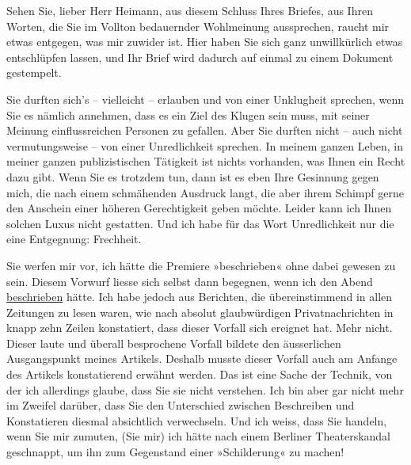 \pstart
           Sehen Sie, lieber Herr Heimann, aus diesem
               Schluss Ihres Briefes, aus Ihren Worten, die Sie im Vollton bedauernder Wohlmeinung
               aussprechen, raucht mir etwas entgegen, was mir zuwider ist. Hier haben Sie sich ganz unwillkürlich etwas
               entschlüpfen lassen, und Ihr Brief wird dadurch auf einmal zu einem Dokument
               gestempelt.\pend
           
\pstart
           Sie durften sich’s – vielleicht – erlauben und von einer Unklugheit sprechen, wenn
               Sie es nämlich annehmen, dass es ein Ziel des Klugen sein muss, mit seiner Meinung
               einflussreichen Personen zu gefallen. Aber Sie durften nicht – auch nicht
               vermutungsweise – von einer Unredlichkeit sprechen. In meinem ganzen Leben, in mei{\pb}ner ganzen publizistischen
               Tätigkeit ist nichts vorhanden, was Ihnen ein Recht dazu gibt. Wenn Sie es trotzdem
               tun, dann ist es eben Ihre Gesinnung gegen mich, die nach einem schmähenden Ausdruck
               langt, die aber ihrem Schimpf gerne den Anschein einer höheren Gerechtigkeit geben
               möchte. Leider kann ich Ihnen solchen Luxus nicht gestatten. Und ich habe für das
               Wort Unredlichkeit nur die eine Entgegnung: Frechheit.\pend
           
\pstart
           Sie werfen mir vor, ich hätte die Premiere »beschrieben« ohne dabei gewesen zu sein. Diesem Vorwurf liesse
               sich selbst dann begegnen, wenn ich den Abend \uline{beschrieben} hätte. Ich habe jedoch aus Berichten, die übereinstimmend in
               allen Zeitungen zu lesen waren, wie nach absolut glaubwürdigen Privatnachrichten in
               knapp zehn Zeilen konstatiert, dass dieser Vorfall sich ereignet hat. Mehr nicht.
               Dieser laute und überall besprochene Vorfall bildete den äusserlichen Ausgangspunkt
               meines Artikels. Deshalb
               musste dieser Vorfall auch am Anfange des Artikels konstatierend erwähnt werden. Das ist eine Sache
               der Technik, von der ich allerdings glaube, dass Sie sie nicht verstehen. Ich bin
               aber gar nicht mehr im Zweifel darüber, dass Sie den Unterschied zwischen Beschreiben
               und Konstatieren diesmal absichtlich verwechseln. Und ich weiss, dass Sie \label{K_L03438-12v}\label{K_L03438-12}
               handeln, wenn Sie mir zumuten, (Sie mir) ich hätte nach einem Berliner Theaterskandal geschnappt, um ihn zum Gegenstand einer
               »Schilderung« zu machen!\pend
           
